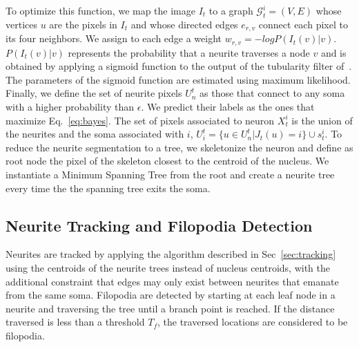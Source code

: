 To optimize this function, we map  the image  $I_t$ to  a graph  $\mathcal{G}_t^i =
(V,E)$ whose vertices  $u$ are the pixels in  $I_t$ and whose directed
edges $e_{r,v}$ connect  each pixel to its four  neighbors.  We assign
to  each edge a  weight $w_{r,v}  = -log  P(I_t(v)|v)$.  $P(I_t(v)|v)$
represents the probability that a  neurite traverses a node $v$ and is
obtained  by  applying  a  sigmoid  function  to  the  output  of  the
tubularity filter  of~\cite{Frangi98}.  The parameters  of the sigmoid
function are  estimated using  maximum likelihood. Finally,  we define
the set  of neurite pixels $U_n^t$  as those that connect  to any soma
with a higher probability than $\epsilon$.  We predict their labels as
the  ones  that  maximize   Eq.~\ref{eq:bayes}.   The  set  of  pixels
associated to neuron $X_t^i$ is the union of the neurites and the soma
associated  with $i$, $  U_i^t =  \{u \in  U_n^t |  J_t(u) =  i\} \cup
s_t^i$. To reduce  the neurite segmentation to a  tree, we skeletonize
the neuron and  define as root node the pixel  of the skeleton closest
to the centroid of the nucleus. We instantiate a Minimum Spanning Tree
from the  root and create a  neurite tree every time the  the spanning tree
exits the soma.





\vspace{-4mm}
\subsection{Neurite Tracking and Filopodia Detection}
\label{sec:neurite}
\vspace{-2mm}
Neurites are tracked by applying the algorithm described in Sec~\ref{sec:tracking} using
the centroids of the neurite trees instead of nucleus centroids, with the additional 
constraint that edges may only exist between neurites that emanate from the same soma.
Filopodia are detected by starting at each leaf node in a neurite and traversing the tree until a branch
point is reached. If the distance traversed is less than a threshold $T_f$, the traversed locations
are considered to be filopodia.







